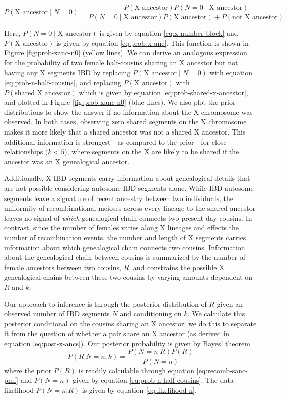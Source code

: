 \documentclass[11pt]{article}
\begin{document}
\begin{equation}
  \label{eq:post-x-ancs}
  P(\text{X ancestor} \;|\; N = 0) = \frac{P(\text{X ancestor})P(N = 0 \;|\; \text{X ancestor})}{P(N = 0 \;|\; \text{X ancestor})P(\text{X ancestor}) + P(\text{not X ancestor})}
\end{equation}

Here, $P(N = 0  \;|\; \text{X ancestor})$ is given by equation
\eqref{eq:x-number-block} and $P(\text{X ancestor})$ is given by equation
\eqref{eq:prob-x-anc}. This function is shown in Figure \ref{fig:prob-xanc-n0}
(yellow lines). We can derive an analogous expression for the probability of
two female half-cousins sharing an X ancestor but not having any X segments IBD
by replacing $P(\text{X ancestor} \;|\; N = 0)$ with equation
\eqref{eq:prob-n-half-cousins}, and replacing $P(\text{X ancestor})$ with
$P(\text{shared X ancestor})$ which is given by equation
\eqref{eq:prob-shared-x-ancestor}, and plotted in Figure \ref{fig:prob-xanc-n0}
(blue lines). We also plot the prior distributions to show the answer if no
information about the X chromosome was observed. In both cases, observing zero
shared segments on the X chromosome makes it more likely that a shared ancestor
was not a shared X ancestor. This additional information is strongest---as
compared to the prior---for close relationships ($k<5$), where segments on the
X are likely to be shared if the ancestor was an X genealogical ancestor. 

Additionally, X IBD segments carry information about genealogical details that
are not possible considering autosome IBD segments alone. While IBD autosome
segments leave a signature of recent ancestry between two individuals, the
uniformity of recombinational meioses across every lineage to the shared
ancestor leaves no signal of \emph{which} genealogical chain connects two
present-day cousins. In contrast, since the number of females varies along X
lineages and effects the number of recombination events, the number and length
of X segments carries information about which genealogical chain connects two
cousins. Information about the genealogical chain between cousins is summarized
by the number of female ancestors between two cousins, $R$, and constrains the
possible X genealogical chains between these two cousins by varying amounts
dependent on $R$ and $k$.

Our approach to inference is through the posterior distribution of $R$ given an
observed number of IBD segments $N$ and conditioning on $k$. We calculate this
posterior conditional on the cousins sharing an X ancestor; we do this to
separate it from the question of whether a pair share an X ancestor (as derived
in equation \eqref{eq:post-x-ancs}). Our posterior probability is given by
Bayes' theorem
%
\begin{equation}
  P(R | N = n, k) = \frac{P(N = n | R) P(R)}{P(N=n)}
\end{equation}
%
where the prior $P(R)$ is readily calculable through equation
\eqref{eq:recomb-sanc-pmf} and $P(N=n)$ given by equation
\eqref{eq:prob-n-half-cousins}. The data likelihood $P(N = n | R)$ is given by
equation \eqref{eq:likelihood-n}.
\end{document}
